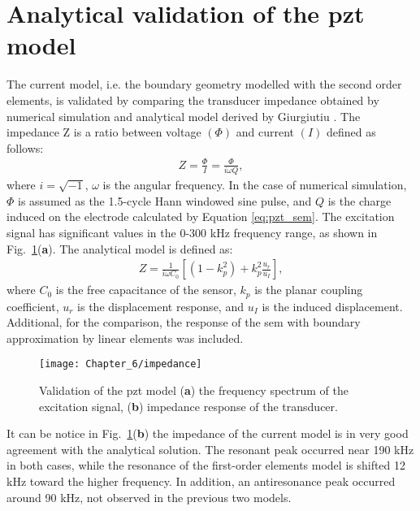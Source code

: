 \section{Analytical validation of the \ac{pzt} model}
\label{sec:pztVal}

The current model, i.e. the boundary geometry modelled with the second order elements, is validated by comparing the transducer impedance obtained by numerical simulation and analytical model derived by Giurgiutiu \cite{giurgiutiu2009micromechatronics}.
The impedance Z is a ratio between voltage \((\Phi)\) and current \((I)\) defined as follows:
\begin{eqnarray}
	Z = \frac{\Phi}{I} = \frac{\Phi}{i\omega Q},
\end{eqnarray}
where \(i=\sqrt{-1}\), \(\omega\) is the angular frequency.
In the case of numerical simulation, \(\Phi\) is assumed as the 1.5-cycle Hann windowed sine pulse, and \(Q\) is the charge induced on the electrode calculated by Equation \ref{eq:pzt_sem}. 
The excitation signal has significant values in the 0-300 kHz frequency range, as shown in Fig.~\ref{fig:impedance}(\textbf{a}).
The analytical model is defined as:
\begin{eqnarray}
	Z = \frac{1}{i\omega C_0}\left[\left(1-k_p^2\right)+k_p^2\frac{u_r}{u_I}\right],
\end{eqnarray}
where \(C_0\) is the free capacitance of the sensor, \(k_p\) is the planar coupling coefficient, \(u_r\) is the displacement response, and \(u_I\) is the induced displacement.
Additional, for the comparison, the response of the \ac{sem} with boundary approximation by linear elements was included. 
\begin{figure}[H]
	\begin{center}
		\texttt{[image: Chapter\_6/impedance]}
	\end{center}
	\caption{Validation of the \ac{pzt} model (\textbf{a}) the frequency spectrum of the excitation signal, (\textbf{b}) impedance response of the transducer.}
	\label{fig:impedance}
\end{figure}

It can be notice in Fig.~\ref{fig:impedance}(\textbf{b}) the impedance of the current model is in very good agreement with the analytical solution.
The resonant peak occurred near 190 kHz in both cases, while the resonance of the first-order elements model is shifted 12 kHz toward the higher frequency.
In addition, an antiresonance peak occurred around 90 kHz, not observed in the previous two models.
